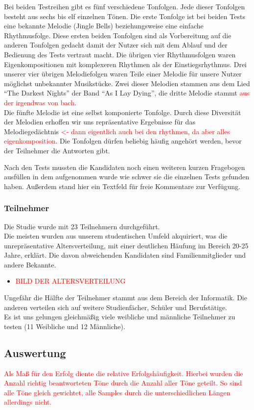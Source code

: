 \documentclass{acm_proc_article-sp}
\begin{document}
Bei beiden Testreihen gibt es fünf verschiedene Tonfolgen. Jede dieser Tonfolgen besteht aus sechs bis elf einzelnen Tönen. Die erste Tonfolge ist bei beiden Tests eine bekannte Melodie (Jingle Bells) beziehungsweise eine einfache Rhythmusfolge. Diese ersten beiden Tonfolgen sind als Vorbereitung auf die anderen Tonfolgen gedacht damit der Nutzer sich mit dem Ablauf und der Bedienung des Tests vertraut macht.
Die übrigen vier Rhythmusfolgen waren Eigenkompositionen mit komplexeren Rhythmen als der Einstiegsrhythmus.
Drei unserer vier übrigen Melodiefolgen waren Teile einer Melodie für unsere Nutzer möglichst unbekannter Musikstücke.
Zwei dieser Melodien stammen aus dem Lied "`The Darkest Nights"' der Band "`As I Lay Dying"', die dritte Melodie stammt \textcolor{red}{aus der irgendwas von bach}.\\
Die fünfte Melodie ist eine selbst komponierte Tonfolge. Durch diese Diversität der Melodien erhoffen wir uns repräsentative Ergebnisse für das Melodiegedächtnis \textcolor{red}{<- dann eigentlich auch bei den rhythmen, da aber alles eigenkomposition}. Die Tonfolgen dürfen beliebig häufig angehört werden, bevor der Teilnehmer die Antworten gibt.
 
Nach den Tests mussten die Kandidaten noch einen weiteren kurzen Fragebogen ausfüllen in dem aufgenommen wurde wie schwer sie die einzelnen Tests gefunden haben. Außerdem stand hier ein Textfeld für freie Kommentare zur Verfügung. 

\subsubsection{Teilnehmer}
Die Studie wurde mit 23 Teilnehmern durchgeführt.\\
Die meisten wurden aus unserem studentischen Umfeld akquiriert, was die unrepräsentative Altersverteilung, mit einer deutlichen Häufung im Bereich 20-25 Jahre, erklärt. Die davon abweichenden Kandidaten sind Familienmitglieder und andere Bekannte.
\begin{itemize} 
\item \textcolor{red}{BILD DER ALTERSVERTEILUNG}
\end{itemize}
Ungefähr die Hälfte der Teilnehmer stammt aus dem Bereich der Informatik. Die anderen verteilen sich auf weitere Studienfächer, Schüler und Berufstätige.\\
Es ist uns gelungen gleichmäßig viele weibliche und männliche Teilnehmer zu testen (11 Weibliche und 12 Männliche). 
\subsection{Auswertung}
\textcolor{red}{Als Maß für den Erfolg diente die relative Erfolgshäufigkeit. Hierbei wurden die Anzahl richtig beantworteten Töne durch die Anzahl aller Töne geteilt. So sind alle Töne gleich gewichtet, alle Samples durch die unterschiedlichen Längen allerdings nicht.}
\end{document}
